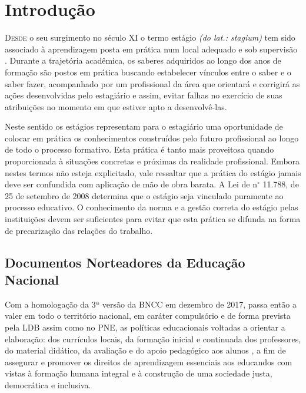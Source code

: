 \chapter{Introdução}
\thispagestyle{empty}
\label{cap:Introducao}

\lettrine{D}{esde} o seu surgimento no século XI o termo estágio \emph{(do lat.: stagium)} tem sido associado à aprendizagem posta em prática num local adequado e sob supervisão \cite{COLOMBO:2014}. Durante a trajetória acadêmica, os saberes adquiridos ao longo dos anos de formação são postos em prática buscando estabelecer vínculos entre o saber e o saber fazer, acompanhado por um profissional da área que orientará e corrigirá as ações desenvolvidas pelo estagiário e assim, evitar falhas no exercício de suas atribuições no momento em que estiver apto a desenvolvê-las.

Neste sentido os estágios representam para o estagiário uma oportunidade de colocar em prática os conhecimentos construídos pelo futuro profissional ao longo de todo o processo formativo. Esta prática é tanto mais proveitosa quando proporcionada à situações concretas e próximas da realidade profissional. Embora nestes termos não esteja explicitado, vale ressaltar que a prática do estágio jamais deve ser confundida com aplicação de mão de obra barata. A Lei de n$^\circ$ 11.788, de 25 de setembro de 2008 determina que o estágio seja vinculado puramente ao processo educativo. O conhecimento da norma e a gestão correta do estágio pelas instituições devem ser suficientes para evitar que esta prática se difunda na forma de precarização das relações do trabalho.

\section{Documentos Norteadores da Educação Nacional}
Com a homologação da 3ª versão da \ac{BNCC} em dezembro de 2017, passa então a valer em todo o território nacional, em caráter compulsório e de forma prevista pela \ac{LDB} assim como no \ac{PNE}, as políticas educacionais voltadas a orientar a elaboração: dos currículos locais, da formação inicial e continuada dos professores, do material didático, da avaliação e do apoio pedagógico aos alunos \cite{BRASIL:2017}, a fim de assegurar e promover os direitos de aprendizagem essenciais aos educandos com vistas à formação humana integral e à construção de uma sociedade justa, democrática e inclusiva.

